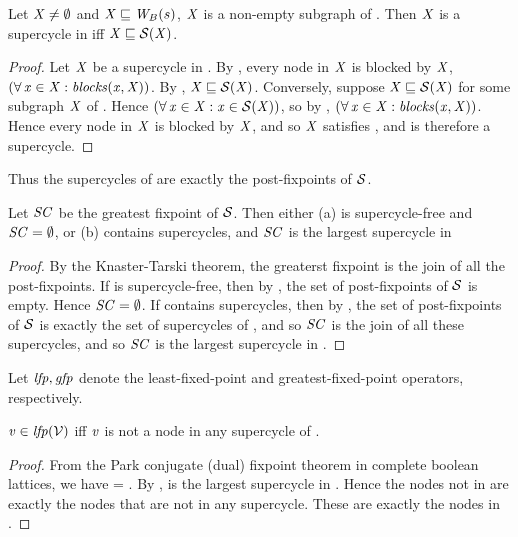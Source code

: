 \begin{proposition} \label{prop:supercycleGFP}
Let $\mathit{X} \ne \emptyset$ and $\mathit{X} \sqsubseteq \mathit{W}_{B}({s})$, \ie $\mathit{X}$ is a non-empty subgraph of . Then $\mathit{X}$ is a supercycle in  iff $\mathit{X} \sqsubseteq \mathcal{S}(\mathit{X})$.
\end{proposition}
%
\begin{proof}
Let $\mathit{X}$ be a supercycle in . By , every node in $\mathit{X}$ is blocked by $\mathit{X}$, \ie 
$(\forall\, \mathit{x} \in \mathit{X}: \mathit{blocks}(\mathit{x}, \mathit{X}))$. By , $\mathit{X} \sqsubseteq \mathcal{S}(\mathit{X})$.
%
Conversely, suppose $\mathit{X} \sqsubseteq \mathcal{S}(\mathit{X})$ for some subgraph $\mathit{X}$ of . Hence 
$(\forall\, \mathit{x} \in \mathit{X}: \mathit{x} \in \mathcal{S}(\mathit{X}))$, so by , $(\forall\, \mathit{x} \in \mathit{X}: \mathit{blocks}(\mathit{x}, \mathit{X}))$.
Hence every node in $\mathit{X}$ is blocked by $\mathit{X}$, and so $\mathit{X}$ satisfies , and is therefore a supercycle.
\end{proof}
%
Thus the supercycles of  are exactly the post-fixpoints of $\mathcal{S}$. %

\begin{proposition} \label{prop:GFPisLargestSC}
Let $\mathit{SC}$ be the greatest fixpoint of $\mathcal{S}$. Then either
(a)  is supercycle-free and $\mathit{SC} = \emptyset$, or 
(b)  contains supercycles, and $\mathit{SC}$ is the largest supercycle in 
\end{proposition}
%
\begin{proof}
By the Knaster-Tarski theorem, the greaterst fixpoint is the join of all the post-fixpoints. 
If  is supercycle-free, then by , the set of post-fixpoints of $\mathcal{S}$ is empty. 
Hence $\mathit{SC} = \emptyset$.
If  contains supercycles, then by ,  the set of post-fixpoints of $\mathcal{S}$ is exactly the set of 
supercycles of , and so $\mathit{SC}$ is the join of all these supercycles, and so $\mathit{SC}$ is the largest supercycle in .
\end{proof}

Let $\mathit{lfp}, \mathit{gfp}$ denote the least-fixed-point and greatest-fixed-point operators, respectively.

\begin{proposition}  \label{prop:LFPisScViolations}
$\mathit{v} \in  \mathit{lfp}(\mathcal{V})$ iff $\mathit{v}$ is not a node in any supercycle of .    
\end{proposition}
%
\begin{proof}
From the Park conjugate (dual) fixpoint theorem in complete boolean lattices, we have 
\lfp{\VFs} = \compl{\gfp{\SFs}}.
By , \gfp{\SFs} is the largest supercycle in . Hence the nodes not in 
\gfp{\SFs} are exactly the nodes that are not in any supercycle. These are exactly the nodes in \lfp{\VFs}.
\end{proof}


